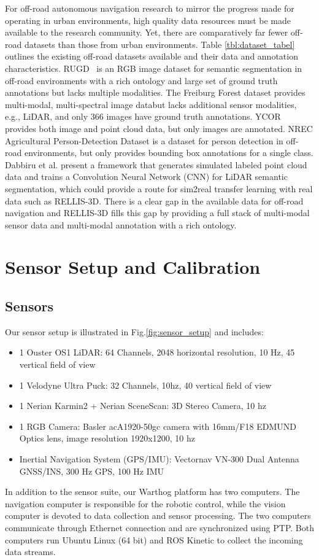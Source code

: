 \documentclass[letterpaper, 10 pt, conference]{ieeeconf}
\begin{document}
For off-road autonomous navigation research to mirror the progress made for operating in urban environments, high quality data resources must be made available to the research community. Yet, there are comparatively far fewer off-road datasets than those from urban environments. Table \ref{tbl:dataset_tabel} outlines the existing off-road datasets available and their data and annotation characteristics. RUGD~\cite{RUGD2019IROS} is an RGB image dataset for semantic segmentation in off-road environments with a rich ontology and large set of ground truth annotations but lacks multiple modalities. The Freiburg Forest dataset \cite{valada16iser} provides multi-modal, multi-spectral image databut lacks additional sensor modalities, e.g., LiDAR, and only 366 images have ground truth annotations. YCOR \cite{Maturana2018} provides both image and point cloud data, but only images are annotated. NREC Agricultural Person-Detection Dataset is a dataset for person detection in off-road environments, but only provides bounding box annotations for a single class. Dabbiru et al. \cite{Dabbiru2020,Goodin2018} present a framework that generates simulated labeled point cloud data and trains a Convolution Neural Network (CNN) for LiDAR semantic segmentation, which could provide a route for sim2real transfer learning with real data such as RELLIS-3D. There is a clear gap in the available data for off-road navigation and RELLIS-3D fills this gap by providing a full stack of multi-modal sensor data and multi-modal annotation with a rich ontology.  \section{Sensor Setup and Calibration}
\subsection{Sensors}
Our sensor setup is illustrated in Fig.\ref{fig:sensor_setup} and includes:


\begin{itemize}
  \item 1  Ouster OS1 LiDAR: 64 Channels, 2048 horizontal resolution, 10 Hz, 45 vertical field of view
  \item 1  Velodyne Ultra Puck: 32 Channels, 10hz, 40 vertical field of view
  \item 1  Nerian Karmin2 + Nerian  SceneScan: 3D Stereo Camera, 10 hz
  \item 1  RGB Camera: Basler acA1920-50gc camera with 16mm/F18 EDMUND Optics lens, image resolution 1920x1200, 10 hz
  \item Inertial Navigation System (GPS/IMU):  Vectornav VN-300 Dual Antenna GNSS/INS, 300 Hz GPS, 100 Hz IMU
\end{itemize}
In addition to the sensor suite, our Warthog platform has two computers. The navigation computer is responsible for the robotic control, while the vision computer is devoted to data collection and sensor processing. The two computers communicate through Ethernet connection and are synchronized using PTP. Both computers run Ubuntu Linux (64 bit) and ROS Kinetic to collect the incoming data streams. 
\end{document}
